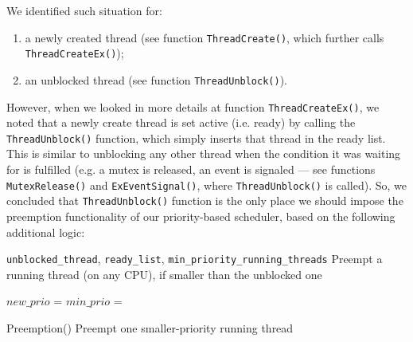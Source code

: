 We identified such situation for:
\begin{enumerate}
    \item a newly created thread (see function \lstinline|ThreadCreate()|, which further calls \lstinline|ThreadCreateEx()|);
    
    \item an unblocked thread (see function \lstinline|ThreadUnblock()|).
\end{enumerate}

However, when we looked in more details at function \lstinline|ThreadCreateEx()|, we noted that a newly create thread is set active (i.e. ready) by calling the \lstinline|ThreadUnblock()| function, which simply inserts that thread in the ready list. This is similar to unblocking any other thread when the condition it was waiting for is fulfilled (e.g. a mutex is released, an event is signaled --- see functions \lstinline|MutexRelease()| and \lstinline|ExEventSignal()|, where \lstinline|ThreadUnblock()| is called). So, we concluded that \lstinline|ThreadUnblock()| function is the only place we should impose the preemption functionality of our priority-based scheduler, based on the following additional logic:


\begin{algorithmic}
\Require \texttt{unblocked\_thread}, \texttt{ready\_list}, \texttt{min\_priority\_running\_threads}
\Ensure Preempt a running thread (on any CPU), if smaller than the unblocked one

\State $new\_prio$ = 
\State $min\_prio$ = 

\State {}

  \State Preemption() \Comment Preempt one smaller-priority running thread
\EndIf
\end{algorithmic}

